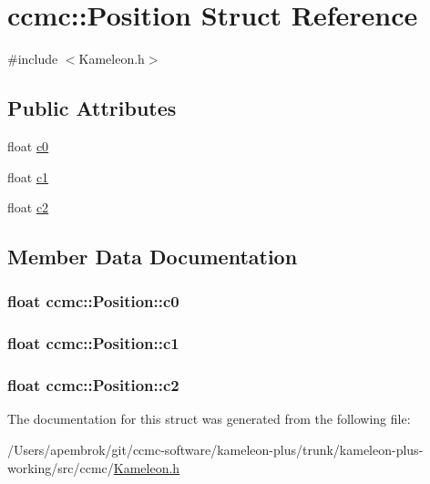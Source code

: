 \hypertarget{structccmc_1_1_position}{\section{ccmc\-:\-:Position Struct Reference}
\label{structccmc_1_1_position}
}


{\ttfamily \#include $<$Kameleon.\-h$>$}

\subsection*{Public Attributes}
\begin{DoxyCompactItemize}
\item 
float \hyperlink{structccmc_1_1_position_a0b395e8f55e11c77b1246aaaad583640}{c0}
\item 
float \hyperlink{structccmc_1_1_position_a3c33c74bbff85c9476f5107b53d26012}{c1}
\item 
float \hyperlink{structccmc_1_1_position_ae38598bba39f42e5dbade94f209b58ca}{c2}
\end{DoxyCompactItemize}


\subsection{Member Data Documentation}
\hypertarget{structccmc_1_1_position_a0b395e8f55e11c77b1246aaaad583640}{
\subsubsection[{c0}]{\setlength{\rightskip}{0pt plus 5cm}float ccmc\-::\-Position\-::c0}}\label{structccmc_1_1_position_a0b395e8f55e11c77b1246aaaad583640}
\hypertarget{structccmc_1_1_position_a3c33c74bbff85c9476f5107b53d26012}{
\subsubsection[{c1}]{\setlength{\rightskip}{0pt plus 5cm}float ccmc\-::\-Position\-::c1}}\label{structccmc_1_1_position_a3c33c74bbff85c9476f5107b53d26012}
\hypertarget{structccmc_1_1_position_ae38598bba39f42e5dbade94f209b58ca}{
\subsubsection[{c2}]{\setlength{\rightskip}{0pt plus 5cm}float ccmc\-::\-Position\-::c2}}\label{structccmc_1_1_position_ae38598bba39f42e5dbade94f209b58ca}


The documentation for this struct was generated from the following file\-:\begin{DoxyCompactItemize}
\item 
/\-Users/apembrok/git/ccmc-\/software/kameleon-\/plus/trunk/kameleon-\/plus-\/working/src/ccmc/\hyperlink{_kameleon_8h}{Kameleon.\-h}\end{DoxyCompactItemize}
